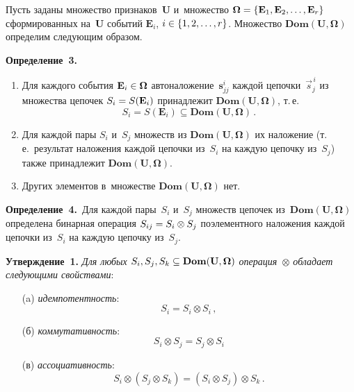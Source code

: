 \begin{multicols}{2}
  \smallskip
  
  Пусть заданы множество признаков~$\mathbf{U}$ и~множество 
$\boldsymbol{\Omega}\hm= \{\mathbf{E}_1, \mathbf{E}_2, \ldots , \mathbf{E}_r\}$ 
сформированных на~$\mathbf{U}$ событий $\mathbf{E}_i$, $i\hm\in\{1, 2, \ldots , 
r\}$. Множество $\mathbf{Dom}(\mathbf{U}, \boldsymbol{\Omega})$ определим 
сле\-ду\-ющим образом.
  
\pagebreak
  
  \noindent
  \textbf{Определение~3.}\ 
  \begin{enumerate}[1.]
  \item  Для каждого события $\mathbf{E}_i \hm\in \boldsymbol{\Omega}$ 
автоналожение~$\mathbf{s}^i_{jj}$ каждой цепочки~$\vec{s}^{\,i}_j$ из множества 
цепочек $S_i\hm=  S(\mathbf{E}_i)$ принадлежит 
$\mathbf{Dom}(\mathbf{U},\boldsymbol{\Omega})$, т.\,е.
  $$
  S_i =S(\mathbf{E}_i)\subseteq 
\mathbf{Dom}(\mathbf{U},\boldsymbol{\Omega})\,.
  $$
  \item  Для каждой пары $S_i$ и~$S_j$ множеств из $\mathbf{Dom}(\mathbf{U}, 
\boldsymbol{\Omega})$ их наложение (т.\,е.\ результат наложения каждой 
цепочки из~$S_i$ на каждую цепочку из~$S_j$) также принадлежит 
$\mathbf{Dom}(\mathbf{U}, \boldsymbol{\Omega})$.
  \item  Других элементов в~множестве 
$\mathbf{Dom}(\mathbf{U},\boldsymbol{\Omega})$ нет.
  \end{enumerate}
  
  \noindent
  \textbf{Определение~4.}\ Для каж\-дой пары~$S_i$ и~$S_j$ множеств цепочек 
из~$\mathbf{Dom}(\mathbf{U}, \boldsymbol{\Omega})$ определена бинарная 
операция $S_{ij}\hm= S_i\otimes S_j$ поэлементного наложения каж\-дой цепочки 
из~$S_i$ на каж\-дую цепочку из~$S_j$.
  
  \smallskip
  
  \noindent
  \textbf{Утверждение~1.} \textit{Для любых $S_i, S_j, S_k \hm\subseteq 
\mathbf{Dom}(\mathbf{U}, \boldsymbol{\Omega})$ операция~$\otimes$ обладает 
сле\-ду\-ющи\-ми свойствами}:
  \begin{itemize}
  \item[(a)] \textit{идемпотентность}:
$$
 S_i = S_i \otimes S_i\,,
$$
\item[(б)] \textit{коммутативность}:
$$
S_i \otimes S_j = S_j \otimes S_i
$$
\item[(в)] \textit{ассоциативность}:
\begin{equation}
S_i \otimes (S_j \otimes S_k) = (S_i \otimes S_j) \otimes S_k\,.
\label{e1-gr}
\end{equation}
\end{itemize}


\end{multicols}
